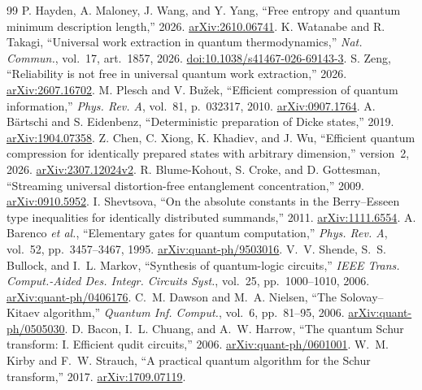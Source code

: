 \begin{thebibliography}{99}
 P. Hayden, A. Maloney, J. Wang, and Y. Yang, ``Free entropy and quantum minimum description length,'' 2026. \href{https://arxiv.org/abs/2610.06741}{arXiv:2610.06741}.
 K. Watanabe and R. Takagi, ``Universal work extraction in quantum thermodynamics,'' \emph{Nat. Commun.}, vol.~17, art.~1857, 2026. \href{https://doi.org/10.1038/s41467-026-69143-3}{doi:10.1038/s41467-026-69143-3}.
 S. Zeng, ``Reliability is not free in universal quantum work extraction,'' 2026. \href{https://arxiv.org/abs/2607.16702}{arXiv:2607.16702}.
 M. Plesch and V. Bu\v{z}ek, ``Efficient compression of quantum information,'' \emph{Phys. Rev. A}, vol.~81, p.~032317, 2010. \href{https://arxiv.org/abs/0907.1764}{arXiv:0907.1764}.
 A. B\"artschi and S. Eidenbenz, ``Deterministic preparation of Dicke states,'' 2019. \href{https://arxiv.org/abs/1904.07358}{arXiv:1904.07358}.
 Z. Chen, C. Xiong, K. Khadiev, and J. Wu, ``Efficient quantum compression for identically prepared states with arbitrary dimension,'' version~2, 2026. \href{https://arxiv.org/abs/2307.12024v2}{arXiv:2307.12024v2}.
 R. Blume-Kohout, S. Croke, and D. Gottesman, ``Streaming universal distortion-free entanglement concentration,'' 2009. \href{https://arxiv.org/abs/0910.5952}{arXiv:0910.5952}.
 I. Shevtsova, ``On the absolute constants in the Berry--Esseen type inequalities for identically distributed summands,'' 2011. \href{https://arxiv.org/abs/1111.6554}{arXiv:1111.6554}.
 A. Barenco \emph{et al.}, ``Elementary gates for quantum computation,'' \emph{Phys. Rev. A}, vol.~52, pp.~3457--3467, 1995. \href{https://arxiv.org/abs/quant-ph/9503016}{arXiv:quant-ph/9503016}.
 V.~V. Shende, S.~S. Bullock, and I.~L. Markov, ``Synthesis of quantum-logic circuits,'' \emph{IEEE Trans. Comput.-Aided Des. Integr. Circuits Syst.}, vol.~25, pp.~1000--1010, 2006. \href{https://arxiv.org/abs/quant-ph/0406176}{arXiv:quant-ph/0406176}.
 C.~M. Dawson and M.~A. Nielsen, ``The Solovay--Kitaev algorithm,'' \emph{Quantum Inf. Comput.}, vol.~6, pp.~81--95, 2006. \href{https://arxiv.org/abs/quant-ph/0505030}{arXiv:quant-ph/0505030}.
 D. Bacon, I.~L. Chuang, and A.~W. Harrow, ``The quantum Schur transform: I. Efficient qudit circuits,'' 2006. \href{https://arxiv.org/abs/quant-ph/0601001}{arXiv:quant-ph/0601001}.
 W.~M. Kirby and F.~W. Strauch, ``A practical quantum algorithm for the Schur transform,'' 2017. \href{https://arxiv.org/abs/1709.07119}{arXiv:1709.07119}.

\end{thebibliography}
